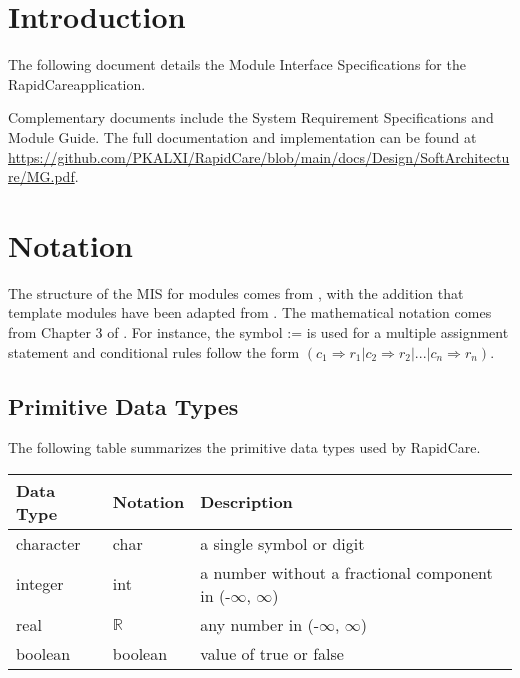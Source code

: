 \documentclass[12pt, titlepage]{article}
\newcommand{\projname}{RapidCare}
\begin{document}
\newpage

\tableofcontents

\newpage


\section{Introduction}

The following document details the Module Interface Specifications for the \projname application.

Complementary documents include the System Requirement Specifications and Module Guide. The full documentation and implementation can be found at \url{https://github.com/PKALXI/RapidCare/blob/main/docs/Design/SoftArchitecture/MG.pdf}.

\section{Notation}


The structure of the MIS for modules comes from \citet{HoffmanAndStrooper1995},
with the addition that template modules have been adapted from
\cite{GhezziEtAl2003}.  The mathematical notation comes from Chapter 3 of
\citet{HoffmanAndStrooper1995}.  For instance, the symbol := is used for a
multiple assignment statement and conditional rules follow the form $(c_1
\Rightarrow r_1 | c_2 \Rightarrow r_2 | ... | c_n \Rightarrow r_n )$.

\subsection{Primitive Data Types}

The following table summarizes the primitive data types used by \projname. 

\begin{center}
\renewcommand{\arraystretch}{1.2}
\noindent 
\begin{tabular}{l l p{7.5cm}} 
\toprule 
\textbf{Data Type} & \textbf{Notation} & \textbf{Description}\\ 
\midrule
character & char & a single symbol or digit\\
integer & int & a number without a fractional component in (-$\infty$, $\infty$) \\
real & $\mathbb{R}$ & any number in (-$\infty$, $\infty$)\\
boolean & boolean & value of true or false \\
\bottomrule
\end{tabular} 
\end{center}
\end{document}

